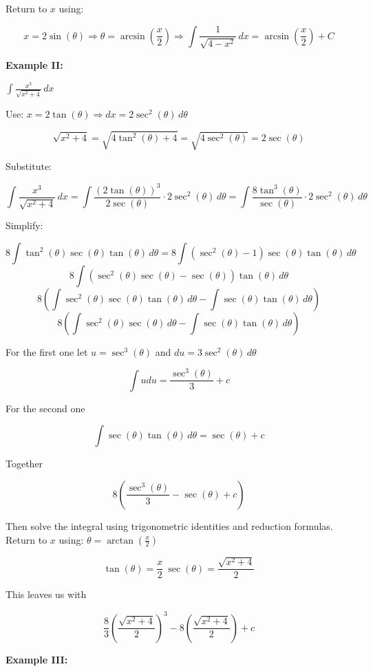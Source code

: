 Return to \(x\) using:

\[
    x = 2\sin(\theta) \Rightarrow \theta = \arcsin\left(\frac{x}{2}\right)
    \Rightarrow \int \frac{1}{\sqrt{4 - x^2}} \,dx = \arcsin\left(\frac{x}{2}\right) + C
\]

\textbf{Example II:} 

\( \int \frac{x^3}{\sqrt{x^2 + 4}} \,dx \)

Use: \( x = 2\tan(\theta) \Rightarrow dx = 2\sec^2(\theta)\, d\theta \)

\[
    \sqrt{x^2 + 4} = \sqrt{4\tan^2(\theta) + 4} = \sqrt{4\sec^2(\theta)} = 2\sec(\theta)
\]

Substitute:

\[
    \int \frac{x^3}{\sqrt{x^2 + 4}}\,dx = \int \frac{{(2\tan(\theta))}^3}{2\sec(\theta)} \cdot 2\sec^2(\theta)\, d\theta
    = \int \frac{8\tan^3(\theta)}{\sec(\theta)} \cdot 2\sec^2(\theta)\, d\theta
\]

Simplify:

\[
    8\int \tan^{2}(\theta)\sec(\theta)\tan(\theta) \,d\theta = 8\int (\sec^2(\theta) - 1)\sec(\theta)\tan(\theta) \,d\theta 
\]
\[
    8\int (\sec^2(\theta)\sec(\theta) - \sec(\theta))\tan(\theta) \,d\theta 
\]
\[
    8\left(\int \sec^2(\theta)\sec(\theta)\tan(\theta) \,d\theta - \int\sec(\theta)\tan(\theta) \,d\theta \right) 
\]
\[
    8\left(\int \sec^2(\theta)\sec(\theta) \,d\theta - \int\sec(\theta)\tan(\theta) \,d\theta \right) 
\]

For the first one let \(u = \sec^3(\theta)\) and \(du = 3\sec^2(\theta)\,d\theta\) 

\[
    \int udu = \frac{\sec^3(\theta)}{3} + c
\]

For the second one

\[
    \int \sec(\theta)\tan(\theta) \,d\theta = \sec(\theta) + c
\]

Together

\[
    8\left(  \frac{\sec^3(\theta)}{3} - \sec(\theta) + c\right)
\]

Then solve the integral using trigonometric identities and reduction formulas. Return to \(x\) using: \( \theta = \arctan\left(\frac{x}{2}\right) \)

\[
    \tan(\theta) = \frac{x}{2}\ \sec(\theta) = \frac{\sqrt{x^2 + 4}}{2}
\]

This leaves us with

\[
    \frac{8}{3} {\left(\frac{\sqrt{x^2 + 4}}{2}\right)}^3 - 8 \left( \frac{\sqrt{x^2 + 4}}{2}\right) + c
\]

\textbf{Example III:} 

